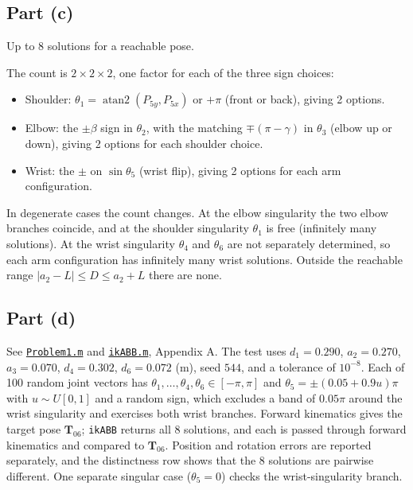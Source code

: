 \documentclass[11pt]{article}
\newcommand{\T}{\bm{T}}
\newcommand{\atantwo}{\operatorname{atan2}}
\begin{document}
\subsection*{Part (c)}
\begin{result}
Up to $8$ solutions for a reachable pose.
\end{result}
The count is $2\times2\times2$, one factor for each of the three sign choices:
\begin{itemize}[leftmargin=1.6em, itemsep=1pt]
    \item Shoulder: $\theta_1=\atantwo(P_{5y},P_{5x})$ or $+\pi$ (front or back), giving 2 options.
    \item Elbow: the $\pm\beta$ sign in $\theta_2$, with the matching $\mp(\pi-\gamma)$ in $\theta_3$ (elbow up or down), giving 2 options for each shoulder choice.
    \item Wrist: the $\pm$ on $\sin\theta_5$ (wrist flip), giving 2 options for each arm configuration.
\end{itemize}
In degenerate cases the count changes. At the elbow singularity the two elbow branches coincide, and at the shoulder singularity $\theta_1$ is free (infinitely many solutions). At the wrist singularity $\theta_4$ and $\theta_6$ are not separately determined, so each arm configuration has infinitely many wrist solutions. Outside the reachable range $|a_2-L|\le D\le a_2+L$ there are none.

\subsection*{Part (d)}
See \hyperref[app:code:problem1]{\texttt{Problem1.m}} and \hyperref[app:code:ikabb]{\texttt{ikABB.m}}, Appendix A. The test uses $d_1=0.290$, $a_2=0.270$, $a_3=0.070$, $d_4=0.302$, $d_6=0.072$ (m), seed $544$, and a tolerance of $10^{-8}$. Each of 100 random joint vectors has $\theta_1,\dots,\theta_4,\theta_6\in[-\pi,\pi]$ and $\theta_5=\pm(0.05+0.9u)\pi$ with $u\sim U[0,1]$ and a random sign, which excludes a band of $0.05\pi$ around the wrist singularity and exercises both wrist branches. Forward kinematics gives the target pose $\T_{06}$; \texttt{ikABB} returns all 8 solutions, and each is passed through forward kinematics and compared to $\T_{06}$. Position and rotation errors are reported separately, and the distinctness row shows that the 8 solutions are pairwise different. One separate singular case ($\theta_5=0$) checks the wrist-singularity branch.

% 
\end{document}
